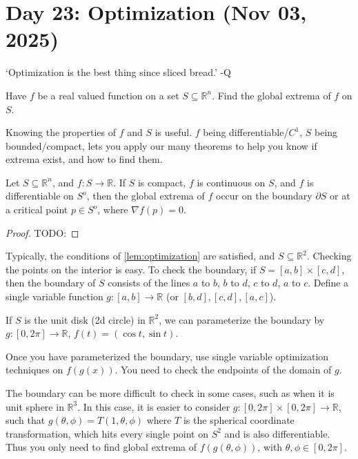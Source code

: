 \section{Day 23: Optimization (Nov 03, 2025)}

`Optimization is the best thing since sliced bread.' -Q

\begin{problem}
Have $f$ be a real valued function on a set $S \subseteq \mathbb{R}^n$.  Find the global extrema of $f$ on $S$.
\end{problem}

Knowing the properties of $f$ and $S$ is useful. $f$ being differentiable/$C^1$, $S$ being bounded/compact, lets you apply our many theorems to help you know if extrema exist, and how to find them.

\begin{simplethm} \label{lem:optimization}
    Let $S \subseteq \mathbb{R}^n$, and $f : S \to \mathbb{R}$. If $S$ is compact, $f$ is continuous on $S$, and $f$ is differentiable on $S^o$, then the global extrema of $f$ occur on the boundary $\partial S$ or at a critical point $p \in S^o$, where $\nabla f(p) = 0$.
\end{simplethm}

\begin{proof}
    TODO:
\end{proof}

Typically, the conditions of \ref{lem:optimization} are satisfied, and $S \subseteq \mathbb{R}^2$. Checking the points on the interior is easy. To check the boundary, if $S = [a, b] \times [c, d]$, then the boundary of $S$ consists of the lines $a$ to $b$, $b$ to $d$, $c$ to $d$, $a$ to $c$. Define a single variable function $g : [a, b] \to \mathbb{R}$ (or $[b, d], [c, d], [a, c]$). 

If $S$ is the unit disk (2d circle) in $\mathbb{R}^2$, we can parameterize the boundary by $g : [0, 2\pi] \to \mathbb{R}$, $f(t) = (\cos t, \sin t)$.

Once you have parameterized the boundary, use single variable optimization techniques on $f(g(x))$. You need to check the endpoints of the domain of $g$.

The boundary can be more difficult to check in some cases, such as when it is unit sphere in $\mathbb{R}^3$. In this case, it is easier to consider $g : [0, 2\pi] \times [0, 2\pi] \to \mathbb{R}$, such that $g(\theta, \phi) = T(1, \theta, \phi)$ where $T$ is the spherical coordinate transformation, which hits every single point on $S^2$ and is also differentiable. Thus you only need to find global extrema of $f(g(\theta, \phi))$, with $\theta, \phi \in [0, 2\pi]$.
